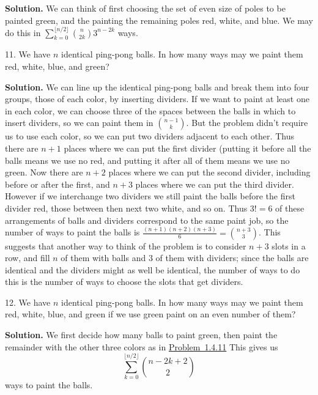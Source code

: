 \documentclass[10pt,]{book}
\theoremstyle{plain}
\theoremstyle{definition}
\theoremstyle{definition}
\numberwithin{equation}{chapter}
\begin{document}
\begin{exerciselist}
\par\smallskip
\par\smallskip
\noindent\textbf{Solution.}\hypertarget{solution-117}{}\quad
We can think of first choosing the set of even size of poles to be painted green, and the painting the remaining poles red, white, and blue.  We may do this in \(\sum_{k=0}^{\lfloor n/2\rfloor}\binom{n}{2k}3^{n-2k}\) ways.%
\item[11.]\hypertarget{pingpongpaint}{}We have \(n\) identical ping-pong balls.  In how many ways may we paint them red, white, blue, and green?%
\par\smallskip
\par\smallskip
\noindent\textbf{Solution.}\hypertarget{solution-118}{}\quad
We can line up the identical ping-pong balls and break them into four groups, those of each color, by inserting dividers. If we want to paint at least one in each color, we can choose three of the spaces between the balls in which to insert dividers, so we can paint them in \(\binom{n-1}{k}\).  But the problem didn't require us to use each color, so we can put two dividers adjacent to each other. Thus there are \(n+1\) places where we can put the first divider (putting it before all the balls means we use no red, and putting it after all of them means we use no green. Now there are \(n+2\) places where we can put the second divider, including before or after the first, and \(n+3\) places where we can put the third divider. However if we interchange two dividers we still paint the balls before the first divider red, those between then next two white, and so on. Thus \(3!=6\) of these arrangements of balls and dividers correspond to the same paint job, so the number of ways to paint the balls is \(\frac{(n+1)(n+2)(n+3)}{6} =\binom{n+3}{3}\). This suggests that another way to think of the problem is to consider \(n+3\) slots in a row, and fill \(n\) of them with balls and \(3\) of them with dividers; since the balls are identical and the dividers might as well be identical, the number of ways to do this is the number of ways to choose the slots that get dividers.%
\item[12.]\hypertarget{exercise-12}{}We have \(n\) identical ping-pong balls.  In how many ways may we paint them red, white, blue, and green if we use green paint on an even number of them?%
\par\smallskip
\par\smallskip
\noindent\textbf{Solution.}\hypertarget{solution-119}{}\quad
We first decide how many balls to paint green, then paint the remainder with the other three colors as in \hyperlink{pingpongpaint}{Problem~1.4.11} This gives us%
\begin{equation*}
\sum_{k=0}^{\lfloor n/2\rfloor}\binom{n-2k+2}{2}
\end{equation*}
ways to paint the balls.%
\end{exerciselist}
\typeout{************************************************}
\typeout{************************************************}
\end{document}
